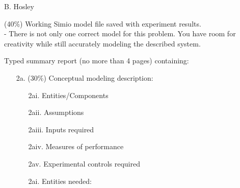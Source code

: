 \documentclass[answers]{exam}
\begin{document}
\hspace{\fill} {\large B. Hosley}
\bigskip

\begin{questions}
\unframedsolutions

\question 
(40\%) Working Simio model file saved with experiment results. \\
- There is not only one correct model for this problem. 
You have room for creativity while still accurately modeling the described system.

\question 
Typed summary report (no more than 4 pages) containing:
\begin{enumerate}
	\item[2a.] (30\%) Conceptual modeling description:
	\begin{enumerate}
		\item[2ai.] Entities/Components
		\item[2aii.] Assumptions
		\item[2aiii.] Inputs required
		\item[2aiv.] Measures of performance 
		\item[2av.] Experimental controls required
	\end{enumerate}
	\begin{solution}
		\begin{enumerate}
			\item[2ai.] 
				Entities needed:
				

\end{enumerate}
\end{solution}
\end{enumerate}
\end{questions}
\end{document}
